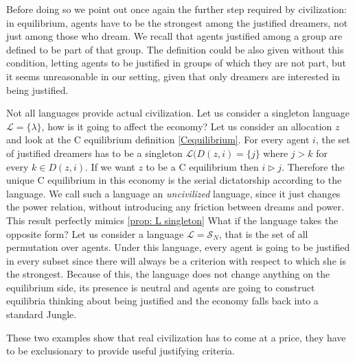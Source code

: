 



Before doing so we point out once again the further step required by civilization: in equilibrium, agents have to be the strongest among the justified dreamers, not just among those who dream. We recall that agents justified among a group are defined to be part of that group. The definition could be also given without this condition, letting agents to be justified in groups of which they are not part, but it seems unreasonable in our setting, given that only dreamers are interested in being justified.

\begin{example}
    Not all languages provide actual civilization. Let us consider a singleton language $\mathcal{L}=\{\lambda\}$, how is it going to affect the economy? Let us consider an allocation $z$ and look at the C equilibrium definition \ref{Cequilibrium}. For every agent $i$, the set of justified dreamers has to be a singleton ${\mathcal{L}}(D(z,i)=\{j\}$ where $j>k$ for every $k\in D(z,i)$. If we want $z$ to be a C equilibrium then $i\triangleright j$. Therefore the unique C equilibrium in this economy is the serial dictatorship according to the language. We call such a language an \textit{uncivilized} language, since it just changes the power relation, without introducing any friction between dreams and power. This result perfectly mimics \cref{prop: L singleton} What if the language takes the opposite form? Let us consider a language $\mathcal{L}=\mathcal{S}_N$, that is the set of all permutation over agents.  Under this language, every agent is going to be justified in every subset since there will always be a criterion with respect to which she is the strongest. Because of this, the language does not change anything on the equilibrium side, its presence is neutral and agents are going to construct equilibria thinking about being justified and the economy falls back into a standard Jungle.

    These two examples show that real civilization has to come at a price, they have to be exclusionary to provide useful justifying criteria.
\end{example}

